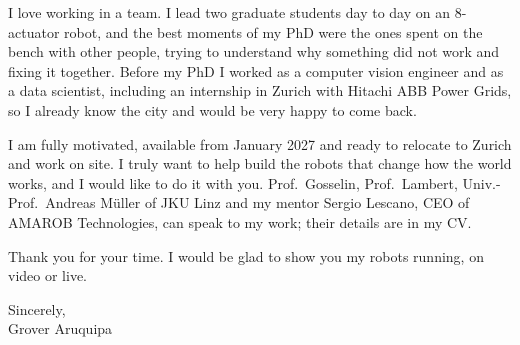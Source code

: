 \documentclass[11pt,a4paper]{article}
\begin{document}
I love working in a team. I lead two graduate students day to day on an 8-actuator robot, and the best moments of my PhD were the ones spent on the bench with other people, trying to understand why something did not work and fixing it together. Before my PhD I worked as a computer vision engineer and as a data scientist, including an internship in Zurich with Hitachi ABB Power Grids, so I already know the city and would be very happy to come back.

I am fully motivated, available from January 2027 and ready to relocate to Zurich and work on site. I truly want to help build the robots that change how the world works, and I would like to do it with you. Prof.\ Gosselin, Prof.\ Lambert, Univ.-Prof.\ Andreas M\"uller of JKU Linz and my mentor Sergio Lescano, CEO of AMAROB Technologies, can speak to my work; their details are in my CV.

Thank you for your time. I would be glad to show you my robots running, on video or live.

Sincerely,\\
Grover Aruquipa
\end{document}
